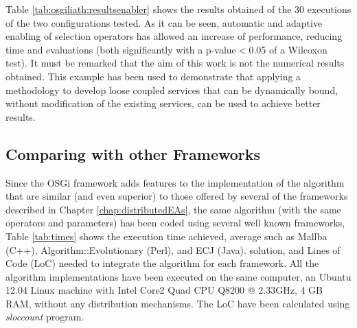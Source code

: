 \begin{table}
\caption{Results obtained using the Asynchronous Enabler.}
\label{tab:osgiliath:resultsenabler}
\end{table}



Table \ref{tab:osgiliath:resultsenabler} shows the results obtained of the 30 executions of the two configurations tested. As it can be seen, automatic and adaptive enabling of selection operators has allowed an increase of performance, reducing time and evaluations (both significantly with a p-value$<$0.05 of a Wilcoxon test). It must be remarked that the aim of this work is not the numerical results obtained. This example has been used to demonstrate that applying a methodology to develop loose coupled services that can be dynamically bound, without modification of the existing services, can be used to achieve better results.




\subsection{Comparing with other Frameworks}
Since the OSGi framework adds features to the implementation of the
algorithm that are similar (and even superior) to those offered by
several of the frameworks described in Chapter
\ref{chap:distributedEAs}, the same algorithm (with the same operators
and parameters) has been coded using several well known frameworks, %
Table \ref{tab:times} shows the execution time achieved, average
such as Mallba (C++), Algorithm::Evolutionary (Perl), and ECJ
(Java). 
solution, and Lines of Code (LoC) needed to integrate the algorithm
for each framework. All the algorithm implementations have been
executed on the same computer, an Ubuntu 12.04 Linux machine with
Intel Core2 Quad CPU Q8200 @ 2.33GHz, 4 GB RAM, without any
distribution mechanisms. The LoC have been calculated using {\em
  sloccount} program. 






